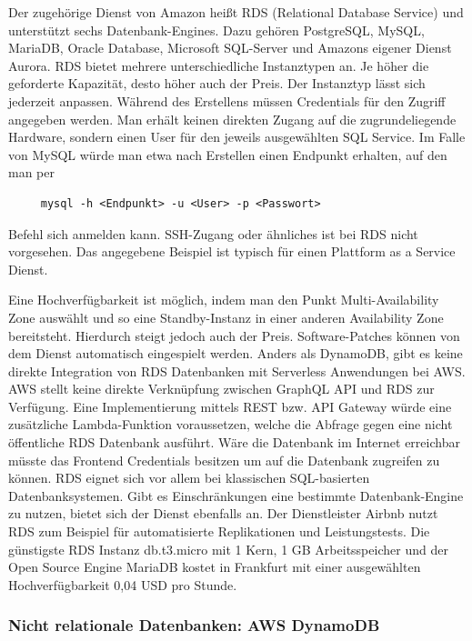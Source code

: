 Der zugehörige Dienst von Amazon heißt RDS (Relational Database Service) und unterstützt sechs Datenbank-Engines. Dazu gehören
PostgreSQL, MySQL, MariaDB, Oracle Database, Microsoft SQL-Server und Amazons eigener Dienst Aurora.
RDS bietet mehrere unterschiedliche Instanztypen an.
Je höher die geforderte Kapazität, desto höher auch der Preis.
Der Instanztyp lässt sich jederzeit anpassen.
Während des Erstellens müssen Credentials für den Zugriff angegeben werden.
Man erhält keinen direkten Zugang auf die zugrundeliegende Hardware, sondern einen User für den jeweils ausgewählten SQL Service.
Im Falle von MySQL würde man etwa nach Erstellen einen Endpunkt erhalten, auf den man per
\begin{lstlisting}
     mysql -h <Endpunkt> -u <User> -p <Passwort>
    \end{lstlisting} Befehl sich anmelden kann. SSH-Zugang oder ähnliches ist bei RDS nicht vorgesehen.
    Das angegebene Beispiel ist typisch für einen Plattform as a Service Dienst.

Eine Hochverfügbarkeit ist möglich, indem man den Punkt Multi-Availability Zone auswählt und so eine Standby-Instanz in einer anderen Availability Zone bereitsteht.
Hierdurch steigt jedoch auch der Preis. Software-Patches können von dem Dienst automatisch eingespielt werden.
Anders als DynamoDB, gibt es keine direkte Integration von RDS Datenbanken mit Serverless Anwendungen bei AWS.
AWS stellt keine direkte Verknüpfung zwischen GraphQL API und RDS zur Verfügung. Eine Implementierung mittels REST bzw. API Gateway würde eine zusätzliche Lambda-Funktion voraussetzen, welche
die Abfrage gegen eine nicht öffentliche RDS Datenbank ausführt. Wäre die Datenbank im Internet erreichbar müsste das Frontend Credentials besitzen um auf die Datenbank zugreifen zu können.
RDS eignet sich vor allem bei klassischen SQL-basierten Datenbanksystemen. Gibt es Einschränkungen eine bestimmte Datenbank-Engine zu nutzen, bietet sich der Dienst ebenfalls an.
Der Dienstleister Airbnb nutzt RDS zum Beispiel für automatisierte Replikationen und Leistungstests.
Die günstigste RDS Instanz \glqq db.t3.micro\grqq{} mit 1 Kern, 1 GB Arbeitsspeicher und der Open Source Engine MariaDB kostet in Frankfurt mit einer ausgewählten Hochverfügbarkeit 0,04 USD pro Stunde. \cite[]{RDS}


\subsubsection{Nicht relationale Datenbanken: AWS DynamoDB}
\label{DynamoDB}

